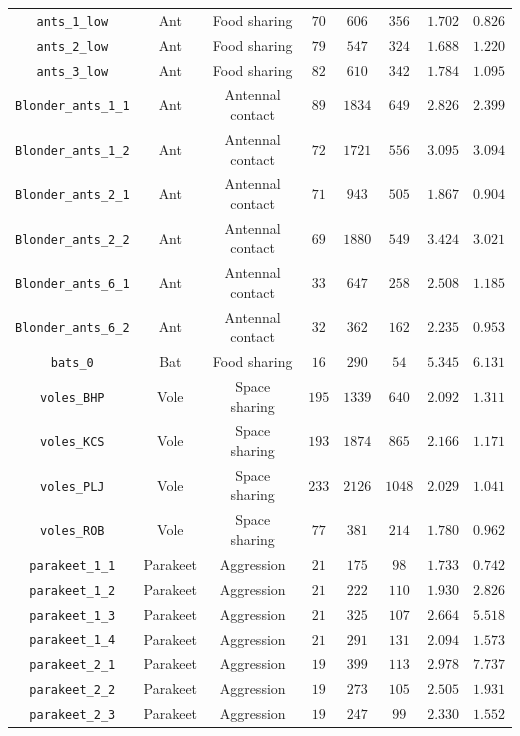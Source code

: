 \documentclass[twocolumn,8pt]{article}
\begin{document}
\begin{table}[p]
\begin{tabular}{c|ccccccc}
\verb|ants_1_low| & Ant & Food sharing & $70$ & $606$ & $356$ & $1.702$ & $0.826$\\
\verb|ants_2_low| & Ant & Food sharing & $79$ & $547$ & $324$ & $1.688$ & $1.220$\\
\verb|ants_3_low| & Ant & Food sharing & $82$ & $610$ & $342$ & $1.784$ & $1.095$\\
\verb|Blonder_ants_1_1| & Ant & Antennal contact & $89$ & $1834$ & $649$ & $2.826$ & $2.399$\\
\verb|Blonder_ants_1_2| & Ant & Antennal contact & $72$ & $1721$ & $556$ & $3.095$ & $3.094$\\
\verb|Blonder_ants_2_1| & Ant & Antennal contact & $71$ & $943$ & $505$ & $1.867$ & $0.904$\\
\verb|Blonder_ants_2_2| & Ant & Antennal contact & $69$ & $1880$ & $549$ & $3.424$ & $3.021$\\
\verb|Blonder_ants_6_1| & Ant & Antennal contact & $33$ & $647$ & $258$ & $2.508$ & $1.185$\\
\verb|Blonder_ants_6_2| & Ant & Antennal contact & $32$ & $362$ & $162$ & $2.235$ & $0.953$\\
\verb|bats_0| & Bat & Food sharing & $16$ & $290$ & $54$ & $5.345$ & $6.131$\\
\verb|voles_BHP| & Vole & Space sharing & $195$ & $1339$ & $640$ & $2.092$ & $1.311$\\
\verb|voles_KCS| & Vole & Space sharing & $193$ & $1874$ & $865$ & $2.166$ & $1.171$\\
\verb|voles_PLJ| & Vole & Space sharing & $233$ & $2126$ & $1048$ & $2.029$ & $1.041$\\
\verb|voles_ROB| & Vole & Space sharing & $77$ & $381$ & $214$ & $1.780$ & $0.962$\\
\verb|parakeet_1_1| & Parakeet & Aggression & $21$ & $175$ & $98$ & $1.733$ & $0.742$\\
\verb|parakeet_1_2| & Parakeet & Aggression & $21$ & $222$ & $110$ & $1.930$ & $2.826$\\
\verb|parakeet_1_3| & Parakeet & Aggression & $21$ & $325$ & $107$ & $2.664$ & $5.518$\\
\verb|parakeet_1_4| & Parakeet & Aggression & $21$ & $291$ & $131$ & $2.094$ & $1.573$\\
\verb|parakeet_2_1| & Parakeet & Aggression & $19$ & $399$ & $113$ & $2.978$ & $7.737$\\
\verb|parakeet_2_2| & Parakeet & Aggression & $19$ & $273$ & $105$ & $2.505$ & $1.931$\\
\verb|parakeet_2_3| & Parakeet & Aggression & $19$ & $247$ & $99$ & $2.330$ & $1.552$\\

\end{tabular}
\end{table}
\end{document}

